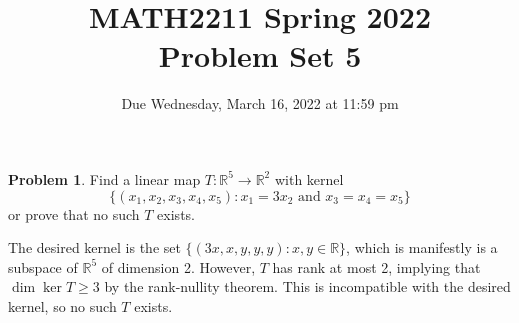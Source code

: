 \documentclass[11pt,oneside]{amsart}
\title{MATH2211 Spring 2022\\
Problem Set 5}
\author{Due Wednesday, March 16, 2022 at 11:59 pm}
\theoremstyle{definition}
\newtheorem{problem}{Problem}
\newcommand{\bR}{\mathbb{R}}
\begin{document}
    \maketitle
    
    \begin{problem}
        Find a linear map $T\colon\bR^5\to\bR^2$ with kernel
        \[\{(x_1, x_2, x_3, x_4, x_5): x_1=3x_2\text{ and }x_3=x_4=x_5\}\]
        or prove that no such $T$ exists.
    \end{problem}
    \begin{solution}
        The desired kernel is the set $\{(3x,x,y,y,y):x,y\in\bR\}$, which is manifestly is a subspace of $\bR^5$ of dimension 2. However, $T$ has rank at most 2, implying that $\dim\ker T\geq 3$ by the rank-nullity theorem. This is incompatible with the desired kernel, so no such $T$ exists.
    \end{solution}
    
\end{document}
